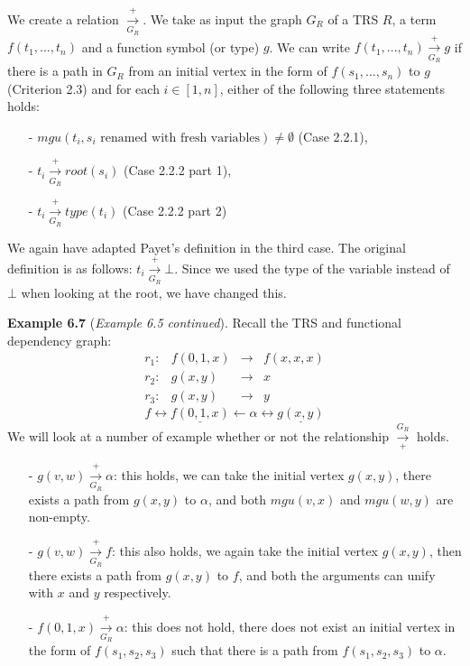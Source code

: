 We create a relation $\xrightarrow[G_R]{+}$. We take as input the graph $G_R$ of a TRS $R$, a term $f(t_1, \dots, t_n)$ and a function symbol (or type) $g$. We can write $f(t_1, \dots, t_n) \xrightarrow[G_R]{+} g$ if there is a path in $G_R$ from an initial vertex in the form of $f(s_1, \dots, s_n)$ to $g$ (Criterion 2.3) and for each $i \in [1, n]$, either of the following three statements holds:
\begin{itemize}
    \itemsep 0em
    \item[-] $\textit{mgu}(t_i, s_i \text{ renamed with fresh variables}) \neq \emptyset$ (Case 2.2.1),
    \item[-] $t_i \xrightarrow[G_R]{+} \textit{root}(s_i)$ (Case 2.2.2 part 1),
    \item[-] $t_i \xrightarrow[G_R]{+} \textit{type}(t_i)$ (Case 2.2.2 part 2)
\end{itemize}

We again have adapted Payet's definition in the third case. The original definition is as follows: $t_i \xrightarrow[G_R]{+} \bot$. Since we used the type of the variable instead of $\bot$ when looking at the root, we have changed this.

\textbf{Example 6.7} (\textit{Example 6.5 continued}). Recall the TRS and functional dependency graph:
\[
\begin{array}{lrcl}
    r_1: & f(0, 1, x) & \rightarrow & f(x, x, x) \\
    r_2: & g(x, y) & \rightarrow & x \\
    r_3: & g(x, y) & \rightarrow & y
\end{array}
\]
\[
f \longleftrightarrow \underline{f(0, 1, x)} \longleftarrow \alpha \longleftrightarrow \underline{g(x,y)}
\]
We will look at a number of example whether or not the relationship $\xrightarrow[+]{G_R}$ holds. 
\begin{itemize}
    \itemsep 0em
    \item[-] $g(v, w) \xrightarrow[G_R]{+} \alpha$: this holds, we can take the initial vertex $g(x, y)$, there exists a path from $g(x, y)$ to $\alpha$, and both $\textit{mgu}(v, x)$ and $\textit{mgu}(w, y)$ are non-empty. 
    \item[-] $g(v, w) \xrightarrow[G_R]{+} f$: this also holds, we again take the initial vertex $g(x, y)$, then there exists a path from $g(x, y)$ to $f$, and both the arguments can unify with $x$ and $y$ respectively. 
    \item[-] $f(0, 1, x) \xrightarrow[G_R]{+} \alpha$: this does not hold, there does not exist an initial vertex in the form of $f(s_1, s_2, s_3)$ such that there is a path from $f(s_1, s_2, s_3)$ to $\alpha$.
\end{itemize}

